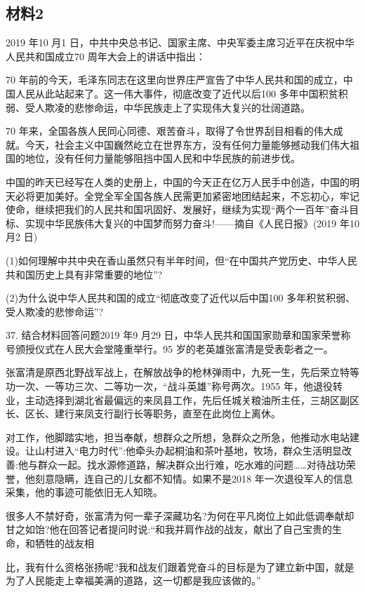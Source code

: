 \documentclass[UTF8,11pt]{ctexart}
\begin{document}
\subsection*{材料2}

2019 年10 月1 日，中共中央总书记、国家主席、中央军委主席习近平在庆祝中华人民共和国成立70 周年大会上的讲话中指出：

70 年前的今天，毛泽东同志在这里向世界庄严宣告了中华人民共和国的成立，中国人民从此站起来了。这一伟大事件，彻底改变了近代以后100 多年中国积贫积弱、受人欺凌的悲惨命运，中华民族走上了实现伟大复兴的壮阔道路。

70 年来，全国各族人民同心同德、艰苦奋斗，取得了令世界刮目相看的伟大成就。今天，社会主义中国巍然屹立在世界东方，没有任何力量能够撼动我们伟大祖国的地位，没有任何力量能够阻挡中国人民和中华民族的前进步伐。

中国的昨天已经写在人类的史册上，中国的今天正在亿万人民手中创造，中国的明天必将更加美好。全党全军全国各族人民需更加紧密地团结起来，不忘初心，牢记使命，继续把我们的人民共和国巩固好、发展好，继续为实现“两个一百年”奋斗目标、实现中华民族伟大复兴的中国梦而努力奋斗!——摘自《人民日报》(2019 年10 月2 日)

(1)如何理解中共中央在香山虽然只有半年时间，但“在中国共产党历史、中华人民共和国历史上具有非常重要的地位”?


(2)为什么说中华人民共和国的成立“彻底改变了近代以后中国100 多年积贫积弱、受人欺凌的悲惨命运”?


37. 结合材料回答问题2019 年9 月29 日，中华人民共和国国家勋章和国家荣誉称号颁授仪式在人民大会堂隆重举行。95 岁的老英雄张富清是受表彰者之一。

张富清是原西北野战军战上，在解放战争的枪林弹雨中，九死一生，先后荣立特等功一次、一等功三次、二等功一次，“战斗英雄”称号两次。1955 年，他退役转业，主动选择到湖北省最偏远的来凤县工作，先后任城关粮油所主任，三胡区副区长、区长、建行来凤支行副行长等职务，直至在此岗位上离休。

对工作，他脚踏实地，担当奉献，想群众之所想，急群众之所急，他推动水电站建设。让山村进入“电力时代”:他牵头办起桐油和茶叶基地，牧场，群众生活明显改善:他与群众一起。找水源修道路，解决群众出行难，吃水难的问题……对待战功荣誉，他刻意隐瞒，连自己的儿女都不知情。如果不是2018 年一次退役军人的信息采集，他的事迹可能依旧无人知晓。

很多人不禁好奇，张富清为何一辈子深藏功名?为何在平凡岗位上如此低调奉献却甘之如饴?他在回答记者提问时说:“和我并肩作战的战友，献出了自己宝贵的生命，和牺牲的战友相

比，我有什么资格张扬呢?我和战友们跟着党奋斗的目标是为了建立新中国，就是为了人民能走上幸福美满的道路，这一切都是我应该做的。”
\end{document}
